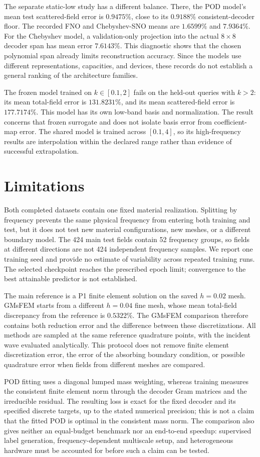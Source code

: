 The separate static-low study has a different balance. There, the POD model's mean test scattered-field error is $0.9475\%$, close to its $0.9188\%$ consistent-decoder floor. The recorded FNO and Chebyshev-SNO means are $1.6599\%$ and $7.9364\%$. For the Chebyshev model, a validation-only projection into the actual $8\times8$ decoder span has mean error $7.6143\%$. This diagnostic shows that the chosen polynomial span already limits reconstruction accuracy. Since the models use different representations, capacities, and devices, these records do not establish a general ranking of the architecture families.

The frozen model trained on $k\in[0.1,2]$ fails on the held-out queries with $k>2$: its mean total-field error is $131.8231\%$, and its mean scattered-field error is $177.7174\%$. This model has its own low-band basis and normalization. The result concerns that frozen surrogate and does not isolate basis error from coefficient-map error. The shared model is trained across $[0.1,4]$, so its high-frequency results are interpolation within the declared range rather than evidence of successful extrapolation.

\section{Limitations}
Both completed datasets contain one fixed material realization. Splitting by frequency prevents the same physical frequency from entering both training and test, but it does not test new material configurations, new meshes, or a different boundary model. The 424 main test fields contain 52 frequency groups, so fields at different directions are not 424 independent frequency samples. We report one training seed and provide no estimate of variability across repeated training runs. The selected checkpoint reaches the prescribed epoch limit; convergence to the best attainable predictor is not established.

The main reference is a P1 finite element solution on the saved $h=0.02$ mesh. GMsFEM starts from a different $h=0.04$ fine mesh, whose mean total-field discrepancy from the reference is $0.5322\%$. The GMsFEM comparison therefore contains both reduction error and the difference between these discretizations. All methods are sampled at the same reference quadrature points, with the incident wave evaluated analytically. This protocol does not remove finite element discretization error, the error of the absorbing boundary condition, or possible quadrature error when fields from different meshes are compared.

POD fitting uses a diagonal lumped mass weighting, whereas training measures the consistent finite element norm through the decoder Gram matrices and the irreducible residual. The resulting loss is exact for the fixed decoder and its specified discrete targets, up to the stated numerical precision; this is not a claim that the fitted POD is optimal in the consistent mass norm. The comparison also gives neither an equal-budget benchmark nor an end-to-end speedup: supervised label generation, frequency-dependent multiscale setup, and heterogeneous hardware must be accounted for before such a claim can be tested.
